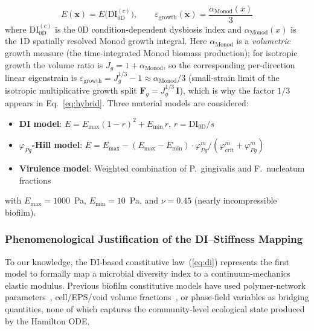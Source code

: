 \documentclass[11pt,a4paper]{article}
\begin{document}
\begin{equation}
  E(\mathbf{x}) = E\bigl(\mathrm{DI}_\text{0D}^{(c)}\bigr), \qquad
  \varepsilon_\mathrm{growth}(\mathbf{x}) = \frac{\alpha_\mathrm{Monod}(x)}{3}
  \label{eq:hybrid}
\end{equation}
where $\mathrm{DI}_\text{0D}^{(c)}$ is the 0D condition-dependent dysbiosis index and $\alpha_\mathrm{Monod}(x)$ is the 1D spatially resolved Monod growth integral. Here $\alpha_\mathrm{Monod}$ is a \emph{volumetric} growth measure (the time-integrated Monod biomass production); for isotropic growth the volume ratio is $J_g = 1+\alpha_\mathrm{Monod}$, so the corresponding per-direction linear eigenstrain is $\varepsilon_\mathrm{growth} = J_g^{1/3}-1 \approx \alpha_\mathrm{Monod}/3$ (small-strain limit of the isotropic multiplicative growth split $\mathbf{F}_g = J_g^{1/3}\,\mathbf{I}$), which is why the factor $1/3$ appears in Eq.~\eqref{eq:hybrid}.
Three material models are considered:
\begin{itemize}
  \item \textbf{DI model}: $E = E_{\max}(1-r)^2 + E_{\min}\, r$,\; $r = \mathrm{DI}_{\text{0D}} / s$
  \item \textbf{$\varphi_{Pg}$-Hill model}: $E = E_{\max} - (E_{\max} - E_{\min}) \cdot \varphi_{Pg}^m / (\varphi_{\mathrm{crit}}^m + \varphi_{Pg}^m)$
  \item \textbf{Virulence model}: Weighted combination of P.~gingivalis and F.~nucleatum fractions
\end{itemize}
with $E_{\max} = 1000$~Pa, $E_{\min} = 10$~Pa, and $\nu = 0.45$ (nearly incompressible biofilm).

\subsubsection{Phenomenological Justification of the DI--Stiffness Mapping}

To our knowledge, the DI-based constitutive law~(\ref{eq:di}) represents the first model to formally map a microbial diversity index to a continuum-mechanics elastic modulus.
Previous biofilm constitutive models have used polymer-network parameters~\cite{EhretBol2013}, cell/EPS/void volume fractions~\cite{Laspidou2014}, or phase-field variables as bridging quantities, none of which captures the community-level ecological state produced by the Hamilton ODE.
\end{document}
